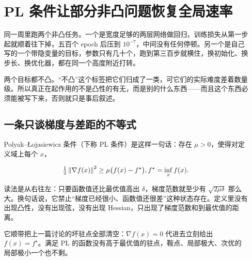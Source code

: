 \section{PL 条件让部分非凸问题恢复全局速率}
\label{sec:09-Convex-Optimization/08-Nonconvex-and-Stochastic-Optimization/03}

同一周里跑两个非凸任务。一个是宽度足够的两层网络做回归，训练损失从第一步起就顺着往下掉，五百个 epoch 后压到 \(10^{-7}\)，中间没有任何停顿。另一个是自己写的一个带隐变量的目标，参数只有几十个，跑到第三百步就横住，换初始化、换步长、换优化器，都在同一个高度附近打转。

两个目标都不凸。``不凸''这个标签把它们归成了一类，可它们的实际难度差着数量级。所以真正在起作用的不是凸性的有无，而是别的什么东西——而且这个东西必须能被写下来，否则就只是事后叙述。

\subsection{一条只谈梯度与差距的不等式}

Polyak--\L{}ojasiewicz 条件（下称 PL 条件）是这样一句话：存在 \(\mu>0\)，使得对定义域上每个 \(x\)，

\[
\tfrac12\left\lVert\nabla f(x)\right\rVert^2\ge\mu\bigl(f(x)-f^\star\bigr),\space f^\star=\inf_x f(x).
\]

读法是从右往左：只要函数值还比最优值高出 \(\delta\)，梯度范数就至少有 \(\sqrt{2\mu\delta}\) 那么大。换句话说，它禁止``梯度已经很小、函数值还很差''这种状态存在。定义里没有出现凸性，没有出现弦，没有出现 Hessian，只出现了梯度范数和到最优值的距离。

它顺带把上一篇讨论的坏驻点全部清空：\(\nabla f(x)=0\) 代进去立刻给出 \(f(x)=f^\star\)。满足 PL 的函数没有高于最优值的驻点，鞍点、局部极大、次优的局部极小一个也不剩。

